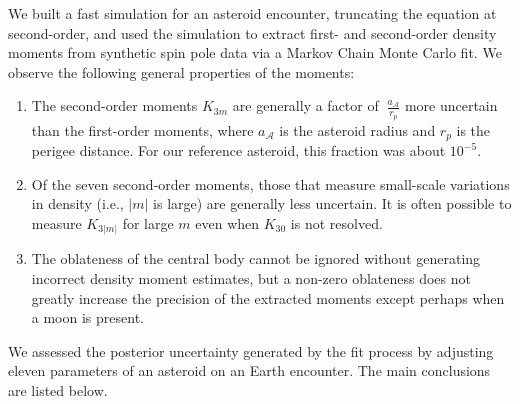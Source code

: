 \documentclass[fleqn,usenatbib]{mnras}
\begin{document}
We built a fast simulation for an asteroid encounter, truncating the equation at second-order, and used the simulation to extract first- and second-order density moments from synthetic spin pole data via a Markov Chain Monte Carlo fit. We observe the following general properties of the moments:
\begin{enumerate}
  \item The second-order moments $K_{3m}$ are generally a factor of $~\frac{a_\mathcal{A}}{r_p}$ more uncertain than the first-order moments, where $a_\mathcal{A}$ is the asteroid radius and $r_p$ is the perigee distance. For our reference asteroid, this fraction was about $10^{-5}$.
  \item Of the seven second-order moments, those that measure small-scale variations in density (i.e., $|m|$ is large) are generally less uncertain. It is often possible to measure $K_{3|m|}$ for large $m$ even when $K_{30}$ is not resolved.
  \item The oblateness of the central body cannot be ignored without generating incorrect density moment estimates, but a non-zero oblateness does not greatly increase the precision of the extracted moments except perhaps when a moon is present.
\end{enumerate}

We assessed the posterior uncertainty generated by the fit process by adjusting eleven parameters of an asteroid on an Earth encounter. The main conclusions are listed below.
\end{document}
